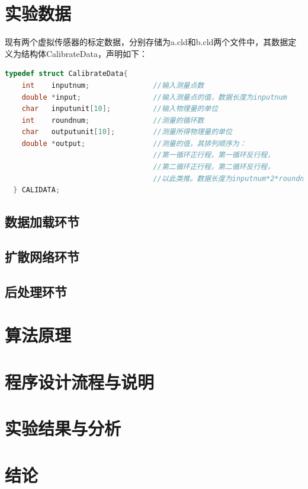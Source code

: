 \documentclass[a4paper,10.5pt,twoside]{article}%
\begin{document}
\section{实验数据}
现有两个虚拟传感器的标定数据，分别存储为a.cld和b.cld两个文件中，其数据定义为结构体CalibrateData，声明如下：
\begin{lstlisting}[language=C]
  typedef struct CalibrateData{
    int    inputnum;               //输入测量点数
    double *input;                 //输入测量点的值，数据长度为inputnum
    char   inputunit[10];          //输入物理量的单位
    int    roundnum;               //测量的循环数
    char   outputunit[10];         //测量所得物理量的单位
    double *output;                //测量的值，其排列顺序为：
                                   //第一循环正行程，第一循环反行程，
                                   //第二循环正行程，第二循环反行程，
                                   //以此类推。数据长度为inputnum*2*roundnum
  } CALIDATA;
\end{lstlisting}
\subsection{数据加载环节}

\subsection{扩散网络环节}

\subsection{后处理环节}

\section{算法原理}

\section{程序设计流程与说明}
\newpage
\section{实验结果与分析}
\newpage
\section{结论}

\newpage
\printbibliography[heading=bibliography,title=参考文献]
\end{document}
